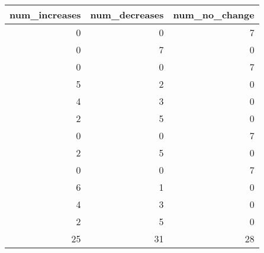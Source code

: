 \begin{tabular}{rrr}
\toprule
num_increases & num_decreases & num_no_change \\
\midrule
0 & 0 & 7 \\
0 & 7 & 0 \\
0 & 0 & 7 \\
5 & 2 & 0 \\
4 & 3 & 0 \\
2 & 5 & 0 \\
0 & 0 & 7 \\
2 & 5 & 0 \\
0 & 0 & 7 \\
6 & 1 & 0 \\
4 & 3 & 0 \\
2 & 5 & 0 \\
25 & 31 & 28 \\
\bottomrule
\end{tabular}
